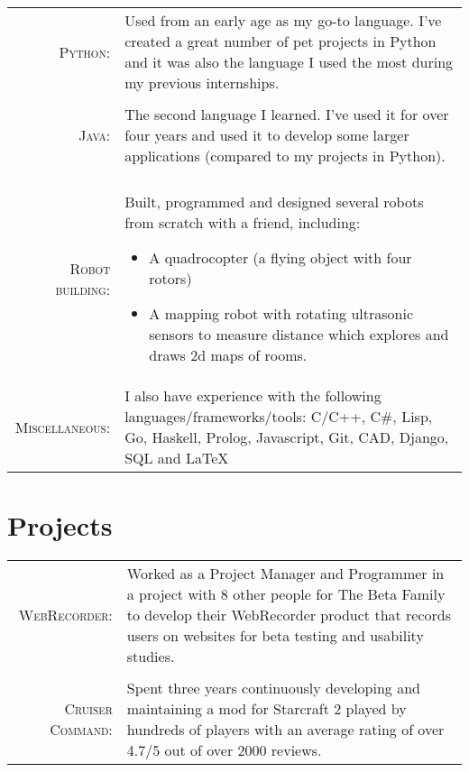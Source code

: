 \documentclass[a4paper,10pt]{article} %
\begin{document}
\begin{tabular}{rp{13cm}}

\textsc{Python:} & \small{Used from an early age as my go-to language. I’ve created a great number of pet projects in Python and it was also the language I used the most during my previous internships.}\\\\

\textsc{Java:} & \small{The second language I learned. I’ve used it for over four years and used it to develop some larger applications (compared to my projects in Python).}\\\\

\textsc{Robot building:} & \small{Built, programmed and designed several robots from scratch with a friend, including:
\begin{itemize}
\item A quadrocopter (a flying object with four rotors)
\item A mapping robot with rotating ultrasonic sensors to measure distance which explores and draws 2d maps of rooms.
\end{itemize}}\\

\textsc{Miscellaneous:} & \small{I also have experience with the following languages/frameworks/tools:  C/C++, C\#, Lisp, Go, Haskell, Prolog, Javascript, Git, CAD, Django, SQL and \LaTeX}

\end{tabular}


\section{Projects}

\begin{tabular}{rp{13cm}}
\textsc{WebRecorder:} & \small{Worked as a Project Manager and Programmer in a project with 8 other people for The Beta Family to develop their WebRecorder product that records users on websites for beta testing and usability studies.} \\\\
\textsc{Cruiser Command:} & \small{Spent three years continuously developing and maintaining a mod for Starcraft 2 played by hundreds of players with an average rating of over 4.7/5 out of over 2000 reviews.}
\end{tabular}
\end{document}
